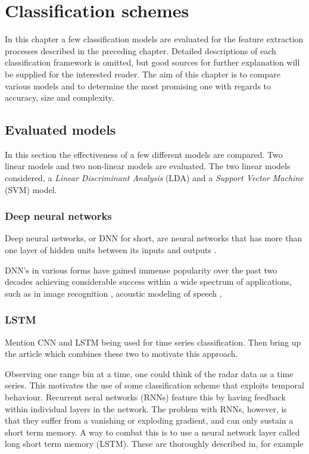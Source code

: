 \chapter{Classification schemes}

In this chapter a few classification models are evaluated for the feature extraction processes described in the preceding chapter. Detailed descriptions of each classification framework is omitted, but good sources for further explanation will be supplied for the interested reader. The aim of this chapter is to compare various models and to determine the most promising one with regards to accuracy, size and complexity. 

\section{Evaluated models}

In this section the effectiveness of a few different models are compared. Two linear models and two non-linear models are evaluated. The two linear models considered, a \emph{Linear Discriminant Analysis} (LDA) and a \emph{Support Vector Machine} (SVM) model.

\subsection{Deep neural networks}

Deep neural networks, or DNN for short, are neural networks that has more than one layer of hidden units between its inputs and outputs \citep{hinton_deng_yu_dahl_mohamed_jaitly_senior_vanhoucke_nguyen_sainath_2012}. 


DNN's in various forms have gained immense popularity over the past two decades achieving considerable success within a wide spectrum of applications, such as in image recognition \citep{szegedy_liu_jia_sermanet_reed_anguelov_erhan_vanhoucke_rabinovich_2018}, acoustic modeling of speech \citep{hinton_deng_yu_dahl_mohamed_jaitly_senior_vanhoucke_nguyen_sainath_2012}, 

\subsection{LSTM}
Mention CNN and LSTM being used for time series classification. Then bring up the article which combines these two to motivate this approach.

Observing one range bin at a time, one could think of the radar data as a time series. This motivates the use of some classification scheme that exploits temporal behaviour. Recurrent neral networks (RNNs) feature this by having feedback within individual layers in the network. \citep{karim_majumdar_darabi_chen_2018} The problem with RNNs, however, is that they suffer from a vanishing or exploding gradient, and can only sustain a short term memory. A way to combat this is to use a neural network layer called long short term memory (LSTM). These are thoroughly described in, for example \citep{hochreiter_schmidhuber_1997}

